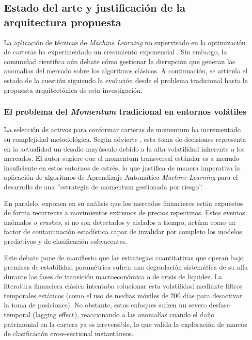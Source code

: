 \documentclass[
]{article}
\begin{document}
	\subsection{Estado del arte y justificación de la arquitectura
		propuesta}\label{estado-del-arte-y-justificaciuxf3n-de-la-arquitectura-propuesta}
	
	La aplicación de técnicas de \emph{Machine Learning} no supervisado en
	la optimización de carteras ha experimentado un crecimiento exponencial \parencite{gu2020, lopezdeprado2018}.
	Sin embargo, la comunidad científica aún debate cómo gestionar la
	disrupción que generan las anomalías del mercado sobre los algoritmos
	clásicos. A continuación, se articula el estado de la cuestión siguiendo
	la evolución desde el problema tradicional hasta la propuesta
	arquitectónica de esta investigación.
	
	\subsubsection{El problema del \emph{Momentum} tradicional en entornos
		volátiles}\label{el-problema-del-momentum-tradicional-en-entornos-voluxe1tiles}
	
	La selección de activos para conformar carteras de \gls{momentum} ha
	incrementado su complejidad metodológica. Según advierte \textcite{aslam2025identifying},
	esta toma de decisiones representa en la actualidad un desafío mayúsculo
	debido a la alta volatilidad inherente a los mercados. El autor sugiere
	que el \gls{momentum} transversal estándar es a menudo insuficiente en
	estos entornos de estrés, lo que justifica de manera imperativa la
	aplicación de algoritmos de Aprendizaje Automático \emph{Machine Learning} para el desarrollo
	de una ''estrategia de \gls{momentum} gestionada por riesgo''.
	
	En paralelo, \textcite{shiraj2024anomaly} exponen en su análisis que los
	mercados financieros están expuestos de forma recurrente a movimientos
	extremos de precios repentinos. Estos eventos anómalos o \emph{crashes},
	si no son detectados y aislados a tiempo, actúan como un factor de
	contaminación estadística capaz de invalidar por completo los modelos
	predictivos y de clasificación subyacentes.
	
	Este debate pone de manifiesto que las estrategias cuantitativas que operan bajo premisas de estabilidad paramétrica sufren una degradación sistemática de su alfa durante las fases de transición macroeconómica o de crisis de liquidez. La literatura financiera clásica intentaba solucionar esta volatilidad mediante filtros temporales estáticos (como el uso de medias móviles de 200 días para desactivar la toma de posiciones). No obstante, estos enfoques sufren un severo desfase temporal (lagging effect), reaccionando a las anomalías cuando el daño patrimonial en la cartera ya es irreversible, lo que valida la exploración de marcos de clasificación cross-sectional instantáneos.
	
\end{document}
